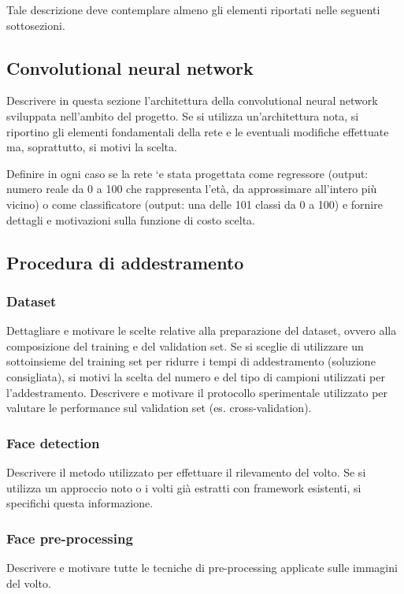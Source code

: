 Tale descrizione deve contemplare almeno gli elementi riportati nelle seguenti
sottosezioni.

\subsection{Convolutional neural network}
Descrivere in questa sezione l’architettura della convolutional neural network
sviluppata nell’ambito del progetto. Se si utilizza un’architettura nota, si riportino gli elementi fondamentali della rete e le eventuali modifiche effettuate ma, soprattutto, si motivi la scelta.

Definire in ogni caso se la rete `e stata progettata come regressore (output:
numero reale da 0 a 100 che rappresenta l’età, da approssimare all’intero più
vicino) o come classificatore (output: una delle 101 classi da 0 a 100) e fornire dettagli e motivazioni sulla funzione di costo scelta.

\subsection{Procedura di addestramento}
\subsubsection{Dataset}
Dettagliare e motivare le scelte relative alla preparazione del dataset, ovvero alla composizione del training e del validation set. Se si sceglie di utilizzare un sottoinsieme del training set per ridurre i tempi di addestramento (soluzione consigliata), si motivi la scelta del numero e del tipo di campioni utilizzati per l’addestramento. Descrivere e motivare il protocollo sperimentale utilizzato per valutare le performance sul validation set (es. cross-validation).

\subsubsection{Face detection} 
Descrivere il metodo utilizzato per effettuare il rilevamento del volto. Se si utilizza un approccio noto o i volti già estratti con framework esistenti, si specifichi questa informazione.

\subsubsection{Face pre-processing} 
Descrivere e motivare tutte le tecniche di pre-processing applicate sulle immagini del volto.

